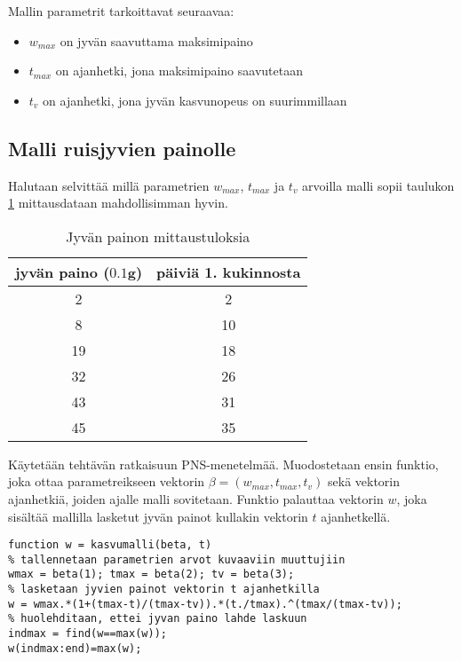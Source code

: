\documentclass[a4paper,11pt]{article}
\begin{document}
{Mallin parametrit tarkoittavat seuraavaa:

\begin{itemize}
    \item $w_{max}$ on jyvän saavuttama maksimipaino
    \item $t_{max}$ on ajanhetki, jona maksimipaino saavutetaan
    \item $t_v$ on ajanhetki, jona jyvän kasvunopeus on suurimmillaan
\end{itemize}

\subsection{Malli ruisjyvien painolle}

Halutaan selvittää millä parametrien $w_{max}$, $t_{max}$ ja $t_v$ arvoilla malli sopii taulukon \ref{table:t2} mittausdataan mahdollisimman hyvin.

\begin{table}[!htb]
    \centering
    \begin{tabular}{|c|c|}
    \hline
    jyvän paino ($0.1$g) & päiviä 1. kukinnosta \\
    \hline
        2 & 2 \\
        8 & 10 \\
        19 & 18 \\
        32 & 26 \\
        43 & 31 \\
        45 & 35 \\
    \hline
    \end{tabular}
    \caption{Jyvän painon mittaustuloksia}
    \label{table:t2}
\end{table}

Käytetään tehtävän ratkaisuun PNS-menetelmää. Muodostetaan ensin funktio, joka ottaa parametreikseen vektorin $\beta = (w_{max}, t_{max}, t_v)$ sekä vektorin ajanhetkiä, joiden ajalle malli sovitetaan. Funktio palauttaa vektorin $w$, joka sisältää mallilla lasketut jyvän painot kullakin vektorin $t$ ajanhetkellä.

\begin{lstlisting}
function w = kasvumalli(beta, t)
% tallennetaan parametrien arvot kuvaaviin muuttujiin
wmax = beta(1); tmax = beta(2); tv = beta(3);
% lasketaan jyvien painot vektorin t ajanhetkilla
w = wmax.*(1+(tmax-t)/(tmax-tv)).*(t./tmax).^(tmax/(tmax-tv));
% huolehditaan, ettei jyvan paino lahde laskuun
indmax = find(w==max(w));
w(indmax:end)=max(w);
\end{lstlisting}

}
\end{document}

